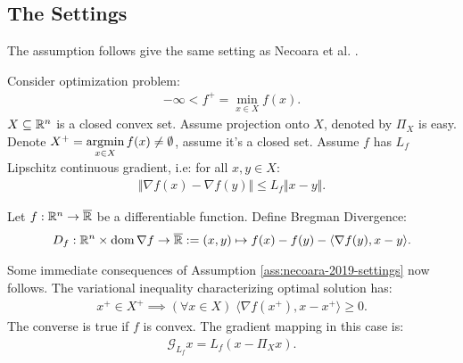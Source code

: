 \documentclass[12pt]{report}
\begin{document}
        \subsection{The Settings}
            The assumption follows give the same setting as Necoara et al. \cite{necoara_linear_2019}. 
            \begin{assumption}\label{ass:necoara-2019-settings}
                Consider optimization problem: 
                \begin{align}
                    -\infty < f^+ = \min_{x \in X} f(x) . 
                \end{align}\label{problem:necoara-2019}
                $X\subseteq \mathbb R^n$ is a closed convex set. 
                Assume projection onto $X$, denoted by $\Pi_X$ is easy. 
                Denote $X^+ = \mathop{\rm argmin}\limits_{x \in X}f(x) \neq \emptyset$, assume it's a closed set. 
                Assume $f$ has $L_f$ Lipschitz continuous gradient, i.e: for all $x, y\in X$: 
                \begin{align*}
                    \Vert \nabla f(x) - \nabla f(y)\Vert \le L_f\Vert x - y\Vert. 
                \end{align*}
            \end{assumption}
            \begin{definition}
                Let $f:\mathbb R^n \rightarrow \overline {\mathbb R}$ be a differentiable function. 
                Define Bregman Divergence: 
                \begin{align*}
                    D_f: \mathbb R^n \times \operatorname{dom} \nabla f \rightarrow \overline {\mathbb R}:= 
                    (x, y) \mapsto f(x) - f(y) - \langle \nabla f(y), x - y\rangle. 
                \end{align*}
            \end{definition}
            Some immediate consequences of Assumption \ref{ass:necoara-2019-settings} now follows. 
            The variational inequality characterizing optimal solution has: 
            \begin{align*}
                x^+ \in X^+ \implies 
                (\forall x \in X)\; \langle \nabla f(x^+), x - x^+\rangle \ge 0. 
            \end{align*}
            The converse is true if $f$ is convex. 
            The gradient mapping in this case is: 
            \begin{align*}
                \mathcal G_{L_f}x = L_f(x - \Pi_{X}x). 
            \end{align*}
\end{document}
